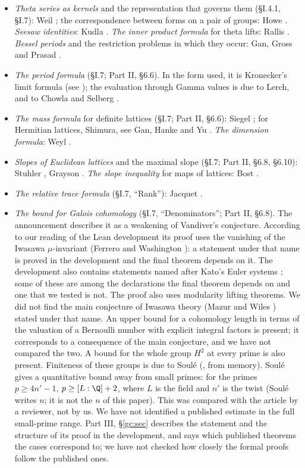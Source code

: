 \documentclass[11pt,letterpaper]{article}
\begin{document}
\begin{itemize}
\item \emph{Theta series as kernels} and the representation that governs them (\S I.4.1, \S I.7): Weil
\cite{Wei64}; the correspondence between forms on a pair of groups: Howe \cite{How79}. \emph{Seesaw
identities}: Kudla \cite{Kud84}. \emph{The inner product formula} for theta lifts: Rallis \cite{Ral87}.
\emph{Bessel periods} and the restriction problems in which they occur: Gan, Gross and Prasad \cite{GGP12}.
\item \emph{The period formula} (\S I.7; Part II, \S6.6). In the form used, it is Kronecker's limit formula
(see \cite{Wei76}); the evaluation through Gamma values is due to Lerch, and to Chowla and Selberg
\cite{CS67}.
\item \emph{The mass formula} for definite lattices (\S I.7; Part II, \S6.6): Siegel \cite{Sie35}; for
Hermitian lattices, Shimura, see Gan, Hanke and Yu \cite{GHY01}. \emph{The dimension formula}: Weyl
\cite{Wey25}.
\item \emph{Slopes of Euclidean lattices} and the maximal slope (\S I.7; Part II, \S6.8, \S6.10): Stuhler
\cite{Stu76}, Grayson \cite{Gra84}. \emph{The slope inequality} for maps of lattices: Bost \cite{Bos96}.
\item \emph{The relative trace formula} (\S I.7, ``Rank''): Jacquet \cite{Jac86}.
\item \emph{The bound for Galois cohomology} (\S I.7, ``Denominators''; Part II, \S6.8). The announcement
describes it as a weakening of Vandiver's conjecture. According to our reading of the Lean development its
proof uses the vanishing of the Iwasawa $\mu$-invariant (Ferrero and Washington \cite{FW79}): a statement
under that name is proved in the development and the final theorem depends on it. The development also
contains statements named after Kato's Euler systems \cite{Kat04}; some of these are among the declarations the
final theorem depends on and one that we tested is not. The proof
also uses modularity lifting theorems. We did not find the main conjecture of Iwasawa theory
(Mazur and Wiles \cite{MW84}) stated under that name. An upper bound for a cohomology length in terms of the
valuation of a Bernoulli number with explicit integral factors is present; it corresponds to a consequence of
the main conjecture, and we have not compared the two. A bound for the whole group $H^2$ at every prime is also
present. Finiteness of these groups is due to Soul\'e (\cite{Sou79}, from memory). Soul\'e
\cite[Thms.~2 and~3]{Sou03} gives a quantitative bound away from small primes: for the primes $p\ge4n'-1$,
$p\ge[L:\Q]+2$, where $L$ is the field and $n'$ is the twist (Soul\'e writes $n$; it is not the $n$ of this
paper). This was compared with the article by a reviewer, not by us. We have not
identified a published estimate in the full small-prime range. Part III, \S\ref{gc:sec} describes the statement and the structure of its proof in the development, and says
which published theorems the cases correspond to; we have not checked how closely the formal proofs follow the
published ones.
\end{itemize}
\end{document}
